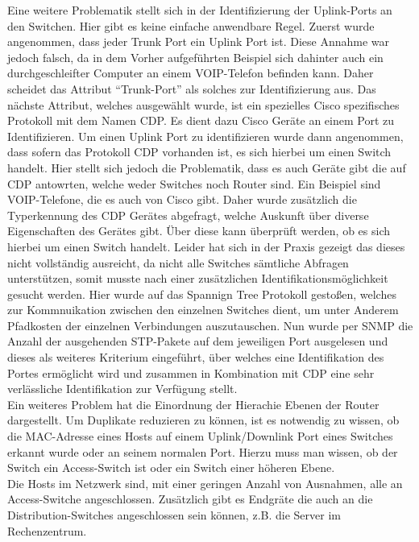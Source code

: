 Eine weitere Problematik stellt sich in der Identifizierung der Uplink-Ports an den Switchen. Hier gibt es keine einfache anwendbare Regel. Zuerst wurde angenommen, dass jeder Trunk Port ein Uplink Port ist. Diese Annahme war jedoch falsch, da in dem Vorher aufgeführten Beispiel sich dahinter auch ein durchgeschleifter Computer an einem VOIP-Telefon befinden kann. Daher scheidet das Attribut “Trunk-Port” als solches zur Identifizierung aus. Das nächste Attribut, welches ausgewählt wurde, ist ein spezielles Cisco spezifisches Protokoll mit dem Namen CDP. Es dient dazu Cisco Geräte an einem Port zu Identifizieren. Um einen Uplink Port zu identifizieren wurde dann angenommen, dass sofern das Protokoll CDP vorhanden ist, es sich hierbei um einen Switch handelt. Hier stellt sich jedoch die Problematik, dass es auch Geräte gibt die auf CDP antowrten, welche weder Switches noch Router sind. Ein Beispiel sind VOIP-Telefone, die es auch von Cisco gibt. Daher wurde zusätzlich die Typerkennung des CDP Gerätes abgefragt, welche Auskunft über diverse Eigenschaften des Gerätes gibt. Über diese kann überprüft werden, ob es sich hierbei um einen Switch handelt. Leider hat sich in der Praxis gezeigt das dieses nicht vollständig ausreicht, da nicht alle Switches sämtliche Abfragen unterstützen, somit musste nach einer zusätzlichen Identifikationsmöglichkeit gesucht werden. Hier wurde auf das Spannign Tree Protokoll gestoßen, welches zur Kommnuikation zwischen den einzelnen Switches dient, um unter Anderem Pfadkosten der einzelnen Verbindungen auszutauschen. Nun wurde per SNMP die Anzahl der ausgehenden STP-Pakete auf dem jeweiligen Port ausgelesen und dieses als weiteres Kriterium eingeführt, über welches eine Identifikation des Portes ermöglicht wird und zusammen in Kombination mit CDP eine sehr verlässliche Identifikation zur Verfügung stellt.\\
Ein weiteres Problem hat die Einordnung der Hierachie Ebenen der Router dargestellt. Um Duplikate reduzieren zu können, ist es notwendig zu wissen, ob die MAC-Adresse eines Hosts auf einem Uplink/Downlink Port eines Switches erkannt wurde oder an seinem normalen Port. Hierzu muss man wissen, ob der Switch ein Access-Switch ist oder ein Switch einer höheren Ebene.\\

Die Hosts im Netzwerk sind, mit einer geringen Anzahl von Ausnahmen, alle an Access-Switche angeschlossen. Zusätzlich gibt es Endgräte die auch an die Distribution-Switches angeschlossen sein können, z.B. die Server im Rechenzentrum. 

